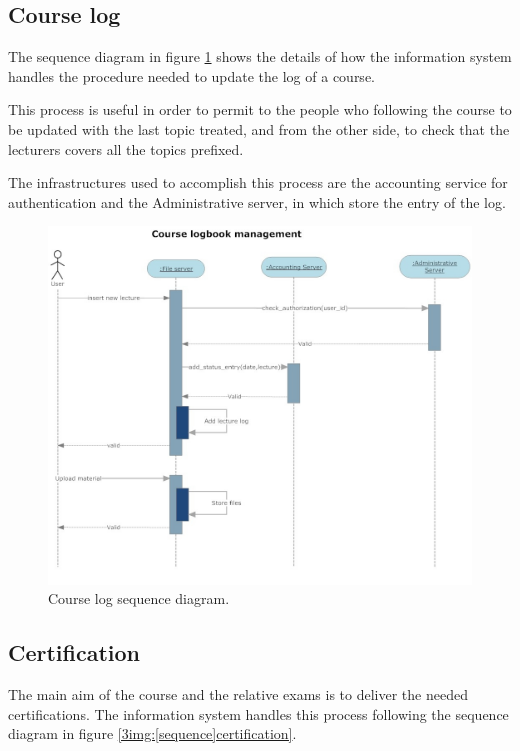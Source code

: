 \subsection{Course log}
The sequence diagram in figure \ref{3img:[sequence]course_log} shows the
details of how the information system handles the procedure needed to
update the log of a course.

This process is useful in order to permit to the people who following the
course to be updated with the last topic treated, and from the other side,
to check that the lecturers covers all the topics prefixed.

The infrastructures used to accomplish this process are the accounting
service for authentication and the Administrative server, in which store
the entry of the log.

\begin{figure}[H]
\begin{centering}
\includegraphics[scale=0.42]{assign3/sdraw/imgs/course_log.jpg}
\caption{Course log sequence diagram.}
\label{3img:[sequence]course_log}
\end{centering}
\end{figure}

\subsection{Certification}
The main aim of the course and the relative exams is to deliver the
needed certifications. The information system handles this process
following the sequence diagram in figure
\ref{3img:[sequence]certification}.

